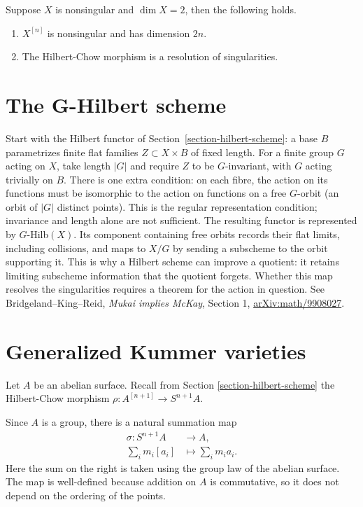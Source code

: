 \begin{theorem}
\label{theorem-fogarty}
Suppose $X$ is nonsingular and $\dim X=2$,
then the following holds.
\begin{enumerate}
\item $X^{[n]}$ is nonsingular and has
dimension $2n$.
\item The Hilbert-Chow morphism is a
resolution of singularities.
\end{enumerate}
\end{theorem}




\section{The G-Hilbert scheme}
\label{section-g-hilb}

\noindent
Start with the Hilbert functor of
Section~\ref{section-hilbert-scheme}:
a base $B$ parametrizes finite flat families
$Z\subset X\times B$ of fixed length.
For a finite group $G$ acting on $X$, take
length $|G|$ and require $Z$ to be
$G$-invariant, with $G$ acting trivially on
$B$. There is one extra condition: on each
fibre, the action on its functions must be
isomorphic to the action on functions on a
free $G$-orbit (an orbit of $|G|$ distinct
points). This is the regular representation
condition; invariance and length alone are
not sufficient. The resulting functor is
represented by $G$-Hilb$(X)$. Its component
containing free orbits records their flat
limits, including collisions, and maps to
$X/G$ by sending a subscheme to the orbit
supporting it. This is why a Hilbert scheme
can improve a quotient: it retains limiting
subscheme information that the quotient
forgets. Whether this map resolves the
singularities requires a theorem for the
action in question. See
Bridgeland--King--Reid,
\emph{Mukai implies McKay}, Section 1,
\href{https://arxiv.org/abs/math/9908027}
{arXiv:math/9908027}.

\section{Generalized Kummer varieties}
\label{section-generalized-kummer}

\noindent
Let $A$ be an abelian surface. Recall from
Section
\ref{section-hilbert-scheme}
the Hilbert-Chow morphism
$
\rho:A^{[n+1]}\longrightarrow S^{n+1}A.
$

\noindent
Since $A$ is a group, there is a natural
summation map
$$
\begin{aligned}
\sigma:S^{n+1}A&\longrightarrow A,\\
\sum_i m_i[a_i]&\longmapsto
\sum_i m_i a_i.
\end{aligned}
$$
Here the sum on the right is taken using the
group law of the abelian surface. The map is
well-defined because addition on $A$ is
commutative, so it does not depend on the
ordering of the points.

